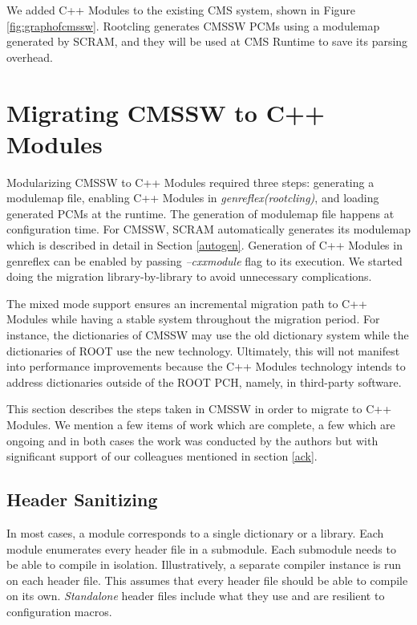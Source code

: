 \documentclass[12pt]{iopart}
\begin{document}
We added C++ Modules to the existing CMS system, shown in Figure \ref{fig:graphofcmssw}. Rootcling generates CMSSW PCMs using a modulemap generated by SCRAM, and they will be used at CMS Runtime to save its parsing overhead.

\section{Migrating CMSSW to C++ Modules}
\label{migration}
Modularizing CMSSW to C++ Modules required three steps: generating a modulemap file, enabling C++ Modules in \textit{genreflex(rootcling)}, and loading generated PCMs at the runtime. The generation of modulemap file happens at configuration time. For CMSSW, SCRAM automatically generates its modulemap which is described in detail in Section \ref{autogen}. Generation of C++ Modules in genreflex can be enabled by passing \textit{--cxxmodule} flag to its execution. We started doing the migration library-by-library to avoid unnecessary complications.

The mixed mode support ensures an incremental migration path to C++ Modules while having a stable system throughout the migration period. For instance, the dictionaries of CMSSW may use the old dictionary system while the dictionaries of ROOT use the new technology. Ultimately, this will not manifest into performance improvements because the C++ Modules technology intends to address dictionaries outside of the ROOT PCH, namely, in third-party software.

This section describes the steps taken in CMSSW in order to migrate to C++ Modules. We mention a few items of work which are complete, a few which are ongoing and in both cases the work was conducted by the authors but with significant support of our colleagues mentioned in section \ref{ack}.

\subsection{Header Sanitizing}
In most cases, a module corresponds to a single dictionary or a library. Each module enumerates every header file in a submodule. Each submodule needs to be able to compile in isolation. Illustratively, a separate compiler instance is run on each header file. This assumes that every header file should be able to compile on its own. \textit{Standalone} header files include what they use and are resilient to configuration macros.
\end{document}

